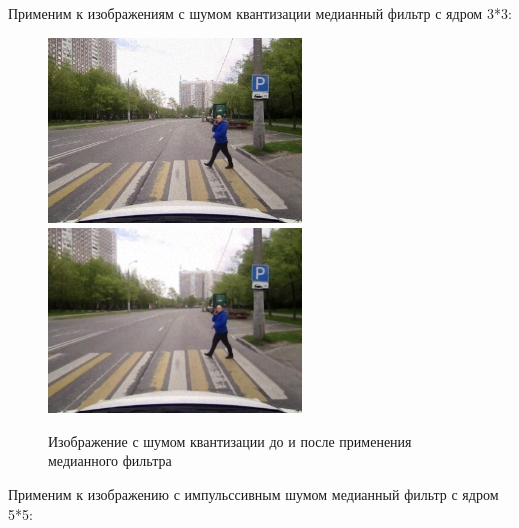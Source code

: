 \pagebreak
Применим к изображениям с шумом квантизации медианный фильтр с ядром 3*3:

\begin{figure}[ht]
    \centering
    \includegraphics[width=0.6\textwidth]{../outputs/image_quant_noise.png}
    \includegraphics[width=0.6\textwidth]{../addition/image_quant_median_filter_k5.png}
    \caption{Изображение с шумом квантизации до и после применения медианного фильтра}
    \label{fig:stich_images}
\end{figure}

\pagebreak

Применим к изображению с импульссивным шумом медианный фильтр с ядром 5*5:


